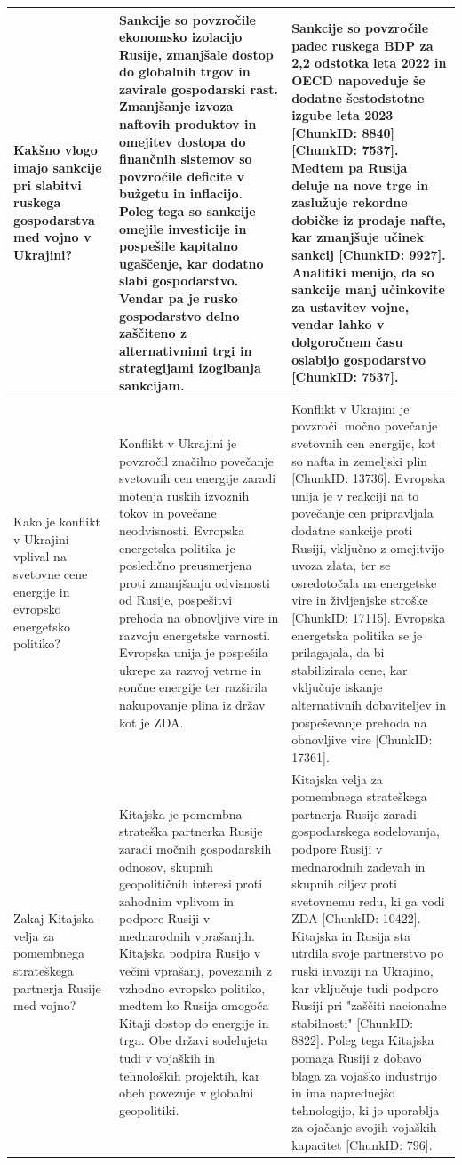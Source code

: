\documentclass[conference]{IEEEtran}
\begin{document}
\begin{longtable}{p{} p{} p{}}
Kakšno vlogo imajo sankcije pri slabitvi ruskega gospodarstva med vojno v Ukrajini? & Sankcije so povzročile ekonomsko izolacijo Rusije, zmanjšale dostop do globalnih trgov in zavirale gospodarski rast. Zmanjšanje izvoza naftovih produktov in omejitev dostopa do finančnih sistemov so povzročile deficite v bužgetu in inflacijo. Poleg tega so sankcije omejile investicije in pospešile kapitalno ugaščenje, kar dodatno slabi gospodarstvo. Vendar pa je rusko gospodarstvo delno zaščiteno z alternativnimi trgi in strategijami izogibanja sankcijam. & Sankcije so povzročile padec ruskega BDP za 2,2 odstotka leta 2022 in OECD napoveduje še dodatne šestodstotne izgube leta 2023 [ChunkID: 8840][ChunkID: 7537]. Medtem pa Rusija deluje na nove trge in zaslužuje rekordne dobičke iz prodaje nafte, kar zmanjšuje učinek sankcij [ChunkID: 9927]. Analitiki menijo, da so sankcije manj učinkovite za ustavitev vojne, vendar lahko v dolgoročnem času oslabijo gospodarstvo [ChunkID: 7537]. \\ \hline
Kako je konflikt v Ukrajini vplival na svetovne cene energije in evropsko energetsko politiko? & Konflikt v Ukrajini je povzročil značilno povečanje svetovnih cen energije zaradi motenja ruskih izvoznih tokov in povečane neodvisnosti. Evropska energetska politika je posledično preusmerjena proti zmanjšanju odvisnosti od Rusije, pospešitvi prehoda na obnovljive vire in razvoju energetske varnosti. Evropska unija je pospešila ukrepe za razvoj vetrne in sončne energije ter razširila nakupovanje plina iz držav kot je ZDA. & Konflikt v Ukrajini je povzročil močno povečanje svetovnih cen energije, kot so nafta in zemeljski plin [ChunkID: 13736]. Evropska unija je v reakciji na to povečanje cen pripravljala dodatne sankcije proti Rusiji, vključno z omejitvijo uvoza zlata, ter se osredotočala na energetske vire in življenjske stroške [ChunkID: 17115]. Evropska energetska politika se je prilagajala, da bi stabilizirala cene, kar vključuje iskanje alternativnih dobaviteljev in pospeševanje prehoda na obnovljive vire [ChunkID: 17361]. \\ \hline
Zakaj Kitajska velja za pomembnega strateškega partnerja Rusije med vojno? & Kitajska je pomembna strateška partnerka Rusije zaradi močnih gospodarskih odnosov, skupnih geopolitičnih interesi proti zahodnim vplivom in podpore Rusiji v mednarodnih vprašanjih. Kitajska podpira Rusijo v večini vprašanj, povezanih z vzhodno evropsko politiko, medtem ko Rusija omogoča Kitaji dostop do energije in trga. Obe državi sodelujeta tudi v vojaških in tehnoloških projektih, kar obeh povezuje v globalni geopolitiki. & Kitajska velja za pomembnega strateškega partnerja Rusije zaradi gospodarskega sodelovanja, podpore Rusiji v mednarodnih zadevah in skupnih ciljev proti svetovnemu redu, ki ga vodi ZDA [ChunkID: 10422]. Kitajska in Rusija sta utrdila svoje partnerstvo po ruski invaziji na Ukrajino, kar vključuje tudi podporo Rusiji pri "zaščiti nacionalne stabilnosti" [ChunkID: 8822]. Poleg tega Kitajska pomaga Rusiji z dobavo blaga za vojaško industrijo in ima naprednejšo tehnologijo, ki jo uporablja za ojačanje svojih vojaških kapacitet [ChunkID: 796]. \\ \hline

\end{longtable}
\end{document}
